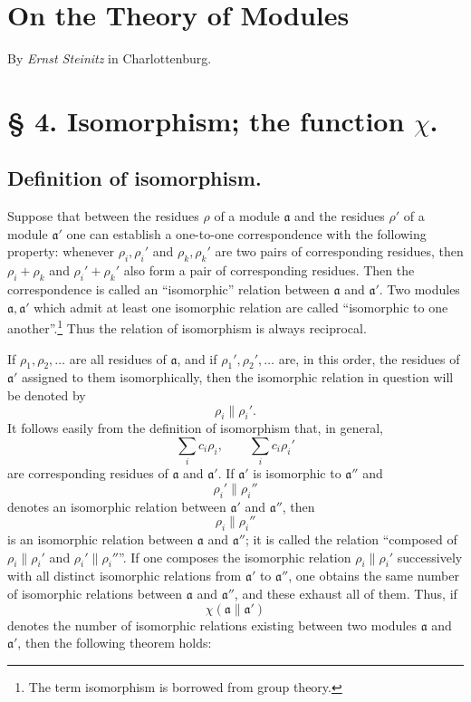 \documentclass[11pt,a4paper]{article}
\begin{document}
\section*{On the Theory of Modules}
\begin{center}
By \emph{Ernst Steinitz} in Charlottenburg.
\end{center}
\section*{§ 4. Isomorphism; the function $\chi$.}

\subsection*{Definition of isomorphism.}

Suppose that between the residues $\rho$ of a module $\mathfrak a$ and the residues $\rho'$ of a module $\mathfrak a'$ one can establish a one-to-one correspondence with the following property: whenever $\rho_i,\rho_i'$ and $\rho_k,\rho_k'$ are two pairs of corresponding residues, then $\rho_i+\rho_k$ and $\rho_i'+\rho_k'$ also form a pair of corresponding residues. Then the correspondence is called an ``isomorphic'' relation between $\mathfrak a$ and $\mathfrak a'$. Two modules $\mathfrak a,\mathfrak a'$ which admit at least one isomorphic relation are called ``isomorphic to one another''.\footnote{The term isomorphism is borrowed from group theory.} Thus the relation of isomorphism is always reciprocal.

If $\rho_1,\rho_2,\ldots$ are all residues of $\mathfrak a$, and if $\rho_1',\rho_2',\ldots$ are, in this order, the residues of $\mathfrak a'$ assigned to them isomorphically, then the isomorphic relation in question will be denoted by
\[
 \rho_i\parallel \rho_i'.
\]
It follows easily from the definition of isomorphism that, in general,
\[
 \sum_i c_i\rho_i,
 \qquad
 \sum_i c_i\rho_i'
\]
are corresponding residues of $\mathfrak a$ and $\mathfrak a'$. If $\mathfrak a'$ is isomorphic to $\mathfrak a''$ and
\[
 \rho_i'\parallel \rho_i''
\]
denotes an isomorphic relation between $\mathfrak a'$ and $\mathfrak a''$, then
\[
 \rho_i\parallel \rho_i''
\]
is an isomorphic relation between $\mathfrak a$ and $\mathfrak a''$; it is called the relation ``composed of $\rho_i\parallel\rho_i'$ and $\rho_i'\parallel\rho_i''$''. If one composes the isomorphic relation $\rho_i\parallel\rho_i'$ successively with all distinct isomorphic relations from $\mathfrak a'$ to $\mathfrak a''$, one obtains the same number of isomorphic relations between $\mathfrak a$ and $\mathfrak a''$, and these exhaust all of them. Thus, if
\[
 \chi(\mathfrak a\parallel\mathfrak a')
\]
denotes the number of isomorphic relations existing between two modules $\mathfrak a$ and $\mathfrak a'$, then the following theorem holds:
\end{document}

